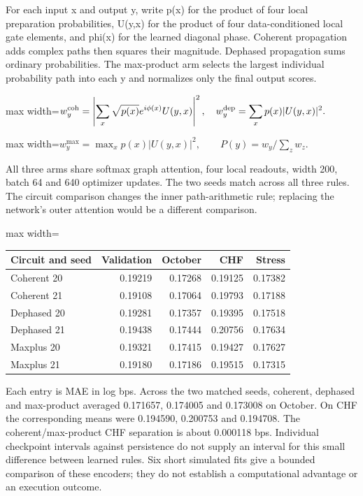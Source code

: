 \documentclass[11pt,oneside,openany]{book}
\begin{document}
For each input x and output y, write p(x) for the product of four local preparation probabilities, U(y,x) for the product of four data-conditioned local gate elements, and phi(x) for the learned diagonal phase. Coherent propagation adds complex paths then squares their magnitude. Dephased propagation sums ordinary probabilities. The max-product arm selects the largest individual probability path into each y and normalizes only the final output scores.

\begin{center}\begin{adjustbox}{max width=\linewidth}$\displaystyle w^{\rm coh}_y=\left|\sum_x\sqrt{p(x)}e^{i\phi(x)}U(y,x)\right|^2,\quad w^{\rm dep}_y=\sum_x p(x)|U(y,x)|^2.$\end{adjustbox}\end{center}
\begin{center}\begin{adjustbox}{max width=\linewidth}$\displaystyle w^{\max}_y=\max_x p(x)|U(y,x)|^2,\qquad P(y)=w_y/\sum_z w_z.$\end{adjustbox}\end{center}
All three arms share softmax graph attention, four local readouts, width 200, batch 64 and 640 optimizer updates. The two seeds match across all three rules. The circuit comparison changes the inner path-arithmetic rule; replacing the network’s outer attention would be a different comparison.

\begin{center}\footnotesize\sffamily\setlength{\tabcolsep}{3.5pt}\renewcommand{\arraystretch}{1.2}
\begin{adjustbox}{max width=\linewidth}\begin{tabular}{@{}lrrrr@{}}\toprule
Circuit and seed & Validation & October & CHF & Stress \\ \midrule
Coherent 20 & 0.19219 & 0.17268 & 0.19125 & 0.17382 \\
Coherent 21 & 0.19108 & 0.17064 & 0.19793 & 0.17188 \\
Dephased 20 & 0.19281 & 0.17357 & 0.19395 & 0.17518 \\
Dephased 21 & 0.19438 & 0.17444 & 0.20756 & 0.17634 \\
Maxplus 20 & 0.19321 & 0.17415 & 0.19427 & 0.17627 \\
Maxplus 21 & 0.19180 & 0.17186 & 0.19515 & 0.17315 \\
\bottomrule\end{tabular}\end{adjustbox}\end{center}
Each entry is MAE in log bps. Across the two matched seeds, coherent, dephased and max-product averaged 0.171657, 0.174005 and 0.173008 on October. On CHF the corresponding means were 0.194590, 0.200753 and 0.194708. The coherent/max-product CHF separation is about 0.000118 bps. Individual checkpoint intervals against persistence do not supply an interval for this small difference between learned rules. Six short simulated fits give a bounded comparison of these encoders; they do not establish a computational advantage or an execution outcome.
\end{document}
